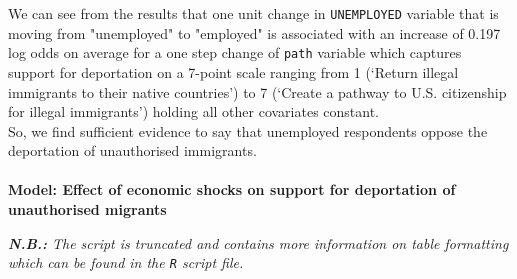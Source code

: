 \documentclass[12pt,letterpaper]{article}
\begin{document}
We can see from the results that one unit change in \texttt{UNEMPLOYED} variable that is moving from "unemployed" to "employed" is associated with an increase of 0.197 log odds on average for a one step change of \texttt{path} variable which captures support for deportation on a 7-point scale ranging from 1 (‘Return illegal immigrants to their native countries’) to 7 (‘Create a pathway to U.S. citizenship for illegal immigrants’) holding all other covariates constant.\\
So, we find sufficient evidence to say that unemployed respondents oppose the deportation of unauthorised immigrants.\\
\\
\textbf{Model: Effect of economic shocks on support for deportation of unauthorised migrants}

\textit{\textbf{N.B.:} The script is truncated and contains more information on table formatting which can be found in the \texttt{R} script file.}
\end{document}
